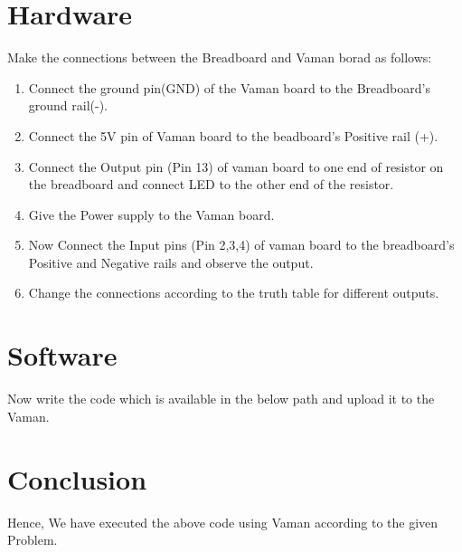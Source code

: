 \documentclass[10pt,a4paper]{article}
\begin{document}
    \section{Hardware}
    Make the connections between the Breadboard and Vaman borad as follows:
    \begin{enumerate}
    	\item Connect the ground pin(GND) of the Vaman board to the Breadboard's ground rail(-).
 	\item Connect the 5V pin of Vaman board to the beadboard's Positive rail (+).
    	\item Connect the Output pin (Pin 13) of vaman board to one end of resistor on the breadboard and connect LED to the other end of the resistor.
    	\item Give the Power supply to the Vaman board.
    	\item Now Connect the Input pins (Pin 2,3,4) of vaman board to the breadboard's Positive and Negative rails and observe the output.
    	\item Change the connections according to the truth table for different outputs.
    \end{enumerate}
\section{Software}
	Now write the code which is available in the below path and upload it to the Vaman. \\
\section{Conclusion}
	Hence, We have executed the above code using Vaman according to the given Problem. 
\end{document}
